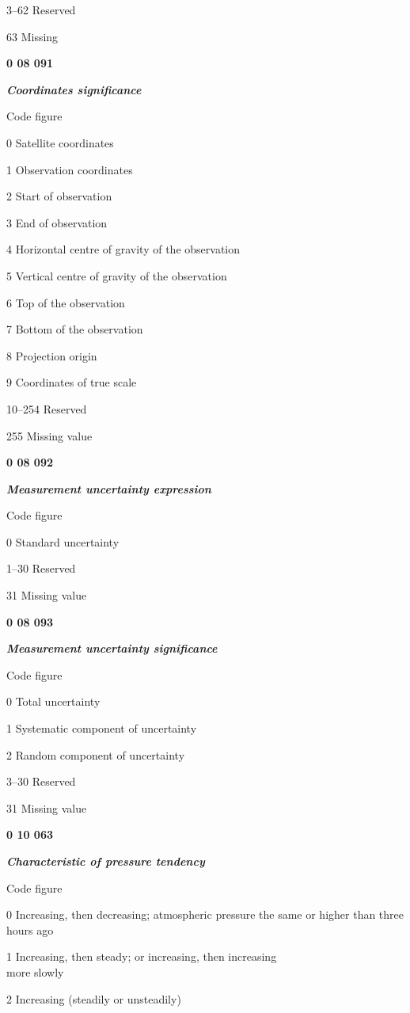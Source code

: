 3--62 Reserved

63 Missing

\textbf{0 08 091}

\emph{\textbf{Coordinates significance}}

Code figure

0 Satellite coordinates

1 Observation coordinates

2 Start of observation

3 End of observation

4 Horizontal centre of gravity of the observation

5 Vertical centre of gravity of the observation

6 Top of the observation

7 Bottom of the observation

8 Projection origin

9 Coordinates of true scale

10--254 Reserved

255 Missing value

\textbf{0 08 092}

\emph{\textbf{Measurement uncertainty expression}}

Code figure

0 Standard uncertainty

1--30 Reserved

31 Missing value

\textbf{0 08 093}

\emph{\textbf{Measurement uncertainty significance}}

Code figure

0 Total uncertainty

1 Systematic component of uncertainty

2 Random component of uncertainty

3--30 Reserved

31 Missing value

\textbf{0 10 063}

\emph{\textbf{Characteristic of pressure tendency}}

Code figure

0 Increasing, then decreasing; atmospheric pressure the same or higher than three hours ago

1 Increasing, then steady; or increasing, then increasing\\
more slowly

2 Increasing (steadily or unsteadily)

